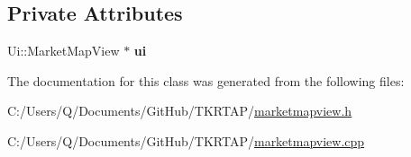 \subsection*{Private Attributes}
\begin{DoxyCompactItemize}
\item 
\hypertarget{class_market_map_view_ad147de5cb234034d0140aa3ba132d49b}{Ui\+::\+Market\+Map\+View $\ast$ {\bfseries ui}}\label{class_market_map_view_ad147de5cb234034d0140aa3ba132d49b}

\end{DoxyCompactItemize}


The documentation for this class was generated from the following files\+:\begin{DoxyCompactItemize}
\item 
C\+:/\+Users/\+Q/\+Documents/\+Git\+Hub/\+T\+K\+R\+T\+A\+P/\hyperlink{marketmapview_8h}{marketmapview.\+h}\item 
C\+:/\+Users/\+Q/\+Documents/\+Git\+Hub/\+T\+K\+R\+T\+A\+P/\hyperlink{marketmapview_8cpp}{marketmapview.\+cpp}\end{DoxyCompactItemize}
